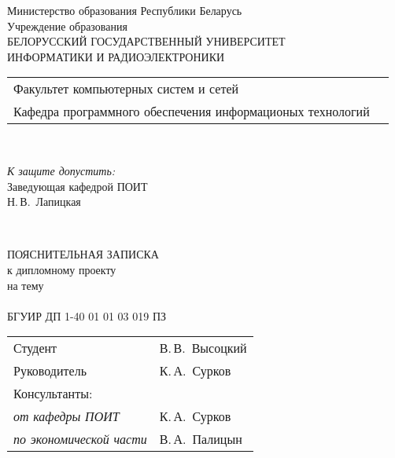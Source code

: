 \begin{titlepage}
  \begin{center}
    Министерство образования Республики Беларусь\\[1em]
    Учреждение образования\\
    БЕЛОРУССКИЙ ГОСУДАРСТВЕННЫЙ УНИВЕРСИТЕТ \\
    ИНФОРМАТИКИ И РАДИОЭЛЕКТРОНИКИ\\[1em]

    \begin{minipage}{\textwidth}
      \begin{flushleft}
        \begin{tabular}{ l l }
          Факультет компьютерных систем и сетей\\
          Кафедра программного обеспечения информационых технологий
        \end{tabular}
      \end{flushleft}
    \end{minipage}\\[1em]

    \begin{flushright}
      \begin{minipage}{0.4\textwidth}
        \textit{К защите допустить:}\\[0.8em]
        Заведующая кафедрой ПОИТ\\[0.45em]
        \underline{\hspace*{2.8cm}} Н.\,В.~Лапицкая
      \end{minipage}\\[2.2em]
    \end{flushright}

    {ПОЯСНИТЕЛЬНАЯ ЗАПИСКА}\\
    {к дипломному проекту}\\
    {на тему}\\[1em]
    \textbf{\large \thesis{}}\\[1em]


    {БГУИР ДП 1-40 01 01 03 019 ПЗ}\\[2em]
    
    \begin{tabular}{ p{}p{} }
      Студент & В.\,В.~Высоцкий \\
      Руководитель & К.\,А.~Сурков \\
      Консультанты: &\\
      \hspace*{3ex}\emph{от кафедры ПОИТ} & К.\,А.~Сурков \\
      \hspace*{3ex}\emph{по экономической части} & В.\,А.~Палицын \\


\end{tabular}
\end{center}
\end{titlepage}

